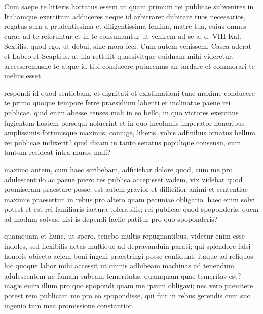


 Cum saepe te litteris hortatus essem ut quam primum rei publicae subvenires in Italiamque exercitum adduceres neque id arbitrarer dubitare tuos necessarios, rogatus sum a prudentissima et diligentissima femina, matre tua, cuius omnes curae ad te referuntur et in te consumuntur ut venirem ad se a. d. VIII Kal. Sextilis. quod ego, ut debui, sine mora feci. Cum autem venissem, Casca aderat et Labeo et Scaptius. at illa rettulit quaesivitque quidnam mihi videretur, arcesseremusne te atque id tibi conducere putaremus an tardare et commorari te melius esset.

 respondi id quod sentiebam, et dignitati et existimationi tuae maxime conducere te primo quoque tempore ferre praesidium labenti et inclinatae paene rei publicae. quid enim abesse censes mali in eo bello, in quo victores exercitus fugientem hostem persequi noluerint et in quo incolumis imperator honoribus amplissimis fortunisque maximis, coniuge, liberis, vobis adfinibus ornatus bellum rei publicae indixerit? quid dicam in tanto senatus populique consensu, cum tantum resideat intra muros mali?

 maximo autem, cum haec scribebam, adficiebar dolore quod, cum me pro adulescentulo ac paene puero res publica accepisset vadem, vix videbar quod promiseram praestare posse. est autem gravior et difficilior animi et sententiae maximis praesertim in rebus pro altero quam pecuniae obligatio. haec enim solvi potest et est rei familiaris iactura tolerabilis; rei publicae quod spoponderis, quem ad modum solvas, nisi is dependi facile patitur pro quo spoponderis?

 quamquam et hunc, ut spero, tenebo multis repugnantibus. videtur enim esse indoles, sed flexibilis aetas multique ad depravanduin parati; qui splendore falsi honoris obiecto aciem boni ingeni praestringi posse confidunt. itaque ad reliquos hic quoque labor mihi accessit ut omnis adhibeam machinas ad tenendum adulescentem ne famam subeam temeritatis. quamquam quae temeritas est? magis enim illum pro quo spopondi quam me ipsum obligavi; nec vero paenitere potest rem publicam me pro eo spopondisse, qui fuit in rebus gerendis cum suo ingenio tum mea promissione constantior.

